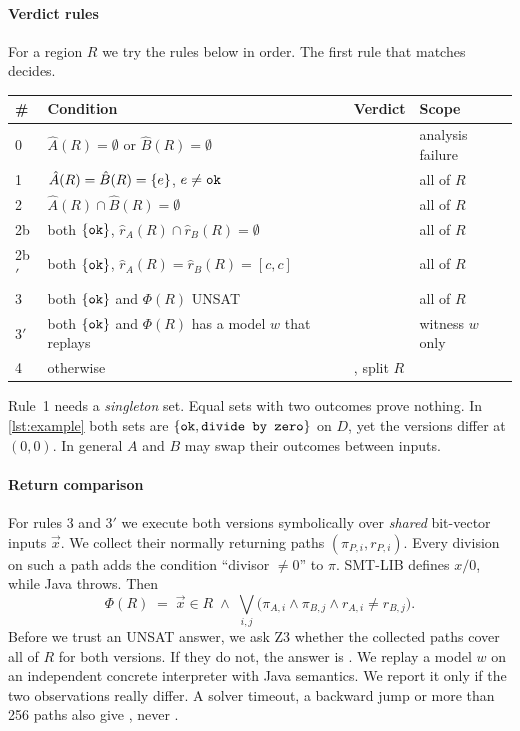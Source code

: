 \paragraph{Verdict rules}
For a region $R$ we try the rules below in order. The first rule that matches decides.
\begin{center}
\small
\begin{tabular}{@{}llll@{}} \toprule
\# & Condition & Verdict & Scope \\ \midrule
0  & $\hat A(R) = \emptyset$ or $\hat B(R) = \emptyset$ & \unk{} & analysis failure \\
1  & $\hat A(R) = \hat B(R) = \left\{e\right\}$, $e \neq \texttt{ok}$ & \pres{} & all of $R$ \\
2  & $\hat A(R) \cap \hat B(R) = \emptyset$ & \chg{} & all of $R$ \\
2b & both $\left\{\texttt{ok}\right\}$, $\hat r_A(R) \cap \hat r_B(R) = \emptyset$ & \chg{} & all of $R$ \\
2b$'$ & both $\left\{\texttt{ok}\right\}$, $\hat r_A(R) = \hat r_B(R) = [c,c]$ & \pres{} & all of $R$ \\
3  & both $\left\{\texttt{ok}\right\}$ and $\Phi(R)$ UNSAT & \pres{} & all of $R$ \\
3$'$ & both $\left\{\texttt{ok}\right\}$ and $\Phi(R)$ has a model $w$ that replays & \chg{} & witness $w$ only \\
4  & otherwise & \unk{}, split $R$ & \\ \bottomrule
\end{tabular}
\end{center}
Rule~1 needs a \emph{singleton} set. Equal sets with two outcomes prove nothing. In
\cref{lst:example} both sets are $\left\{\texttt{ok}, \texttt{divide by zero}\right\}$ on $D$, yet the versions differ at
$(0,0)$. In general $A$ and $B$ may swap their outcomes between inputs.

\paragraph{Return comparison}
For rules 3 and 3$'$ we execute both versions symbolically over \emph{shared} bit-vector
inputs $\vec x$. We collect their normally returning paths $(\pi_{P,i}, r_{P,i})$. Every
division on such a path adds the condition ``divisor $\neq 0$'' to $\pi$. SMT-LIB defines
$x / 0$, while Java throws. Then
\[
  \Phi(R) \;=\; \vec x \in R \;\wedge\; \bigvee_{i,j}\bigl(\pi_{A,i} \wedge \pi_{B,j}
  \wedge r_{A,i} \neq r_{B,j}\bigr).
\]
Before we trust an UNSAT answer, we ask Z3 whether the collected paths cover all of $R$ for
both versions. If they do not, the answer is \unk{}. We replay a model $w$ on an independent
concrete interpreter with Java  semantics. We report it only if the two observations
really differ. A solver timeout, a backward jump or more than 256 paths also give \unk{},
never \pres{}.

